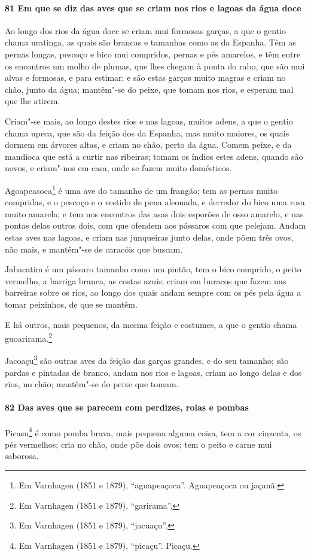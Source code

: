 \begin{linenumbers}
\paragraph{81 Em que se diz das aves que se criam nos rios e lagoas da água doce}\quad
Ao longo dos rios da água doce se criam mui formosas garças, a que o gentio chama
uratinga, as quais são brancas e tamanhas como as da Espanha. Têm as pernas longas,
pescoço e bico mui compridos, pernas e pés amarelos, e têm entre os encontros um molho de
plumas, que lhes chegam à ponta do rabo, que são mui alvas e formosas, e para estimar; e
são estas garças muito magras e criam no chão, junto da água; mantêm"-se do peixe, que
tomam nos rios, e esperam mal que lhe atirem.

Criam"-se mais, ao longo destes rios e nas lagoas, muitos adens, a que o gentio chama
upeca, que são da feição dos da Espanha, mas muito maiores, os quais dormem em árvores
altas, e criam no chão, perto da água. Comem peixe, e da mandioca que está a curtir nas
ribeiras; tomam os índios estes adens, quando são novos, e criam"-nos em casa, onde se
fazem muito domésticos.

Agoapeasoca\footnote{ Em Varnhagen (1851 e 1879), ``aguapeaçoca''. Aguapeaçoca ou jaçanã.}
é uma ave do tamanho de um frangão; tem as pernas muito compridas, e o pescoço e o vestido
de pena aleonada, e derredor do bico uma rosa muito amarela; e tem nos encontros das asas
dois esporões de osso amarelo, e nas pontas delas outros dois, com que ofendem aos
pássaros com que pelejam. Andam estas aves nas lagoas, e criam nas junqueiras junto delas,
onde põem três ovos, não mais, e mantêm"-se de caracóis que buscam.

Jabacatim é um pássaro tamanho como um pintão, tem o bico comprido, o peito vermelho, a
barriga branca, as costas azuis; criam em buracos que fazem nas barreiras sobre os rios,
ao longo dos quais andam sempre com os pés pela água a tomar peixinhos, de que se mantêm.

E há outros, mais pequenos, da mesma feição e costumes, a que o gentio chama
guoarirama.\footnote{ Em Varnhagen (1851 e 1879), ``garirama''.}

Jacoaçu\footnote{ Em Varnhagen (1851 e 1879), ``jacuaçu''.} são outras aves da feição das
garças grandes, e do seu tamanho; são pardas e pintadas de branco, andam nos rios e
lagoas, criam ao longo delas e dos rios, no chão; mantêm"-se do peixe que tomam.

\paragraph{82 Das aves que se parecem com perdizes, rolas e pombas}\quad
Picasu\footnote{ Em Varnhagen (1851 e 1879), ``picaçu''. Picaçu.} é como pomba brava, mais
pequena alguma coisa, tem a cor cinzenta, os pés vermelhos; cria no chão, onde põe dois
ovos; tem o peito e carne mui saborosa.


\end{linenumbers}
